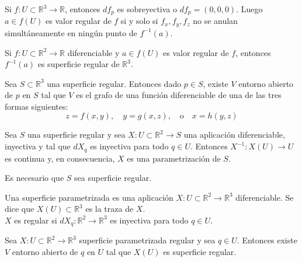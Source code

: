 \begin{remark}
    Si $f : U \subset \mathbb{R}^3 \to \mathbb{R}$, entonces $df_p$ es sobreyectiva o $df_p = (0,0,0)$.
    Luego $a \in f(U)$ es valor regular de $f$ si y solo si $f_x, f_y, f_z$ no se anulan simultáneamente en ningún punto de $f^{-1}(a)$.
\end{remark}

\begin{proposition}
    Si $f: U \subset \mathbb{R}^2 \to \mathbb{R}$ diferenciable y $a \in f(U)$ es valor regular de $f$, entonces $f^{-1}(a)$ es superficie regular de $\mathbb{R}^3$.
\end{proposition}

\begin{proposition}
    Sea $S \subset \mathbb{R}^3$ una superficie regular.
    Entonces dado $p \in S$, existe $V$ entorno abierto de $p$ en $S$ tal que $V$ es el grafo de una función diferenciable de una de las tres formas siguientes:
    $$z = f(x, y), \quad y = g(x, z), \quad \text{o} \quad x = h(y, z)$$
\end{proposition}

\begin{proposition}
    Sea $S$ una superficie regular y sea $X : U \subset \mathbb{R}^2 \to S$ una aplicación diferenciable, inyectiva y tal que $dX_q$ es inyectiva para todo $q \in U$.
    Entonces $X^{-1} : X(U) \to U$ es continua y, en consecuencia, $X$ es una parametrización de $S$.
\end{proposition}

\begin{remark}
    Es necesario que $S$ sea superficie regular.
\end{remark}

\begin{definition}
    Una superficie parametrizada es una aplicación $X : U \subset \mathbb{R}^2 \to \mathbb{R}^3$ diferenciable.
    Se dice que $X(U) \subset \mathbb{R}^3$ es la traza de $X$.\\
    $X$ es regular si $dX_q : \mathbb{R}^2 \to \mathbb{R}^3$ es inyectiva para todo $q \in U$.
\end{definition}

\begin{proposition}
    Sea $X : U \subset \mathbb{R}^2 \to \mathbb{R}^3$ superficie parametrizada regular y sea $q \in U$.
    Entonces existe $V$ entorno abierto de $q$ en $U$ tal que $X(U)$ es superficie regular.
\end{proposition}

